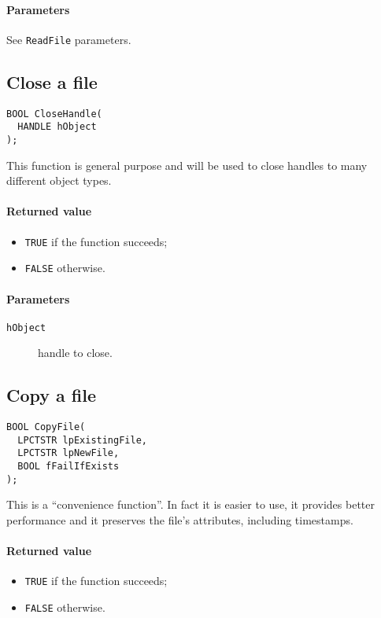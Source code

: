 \paragraph{Parameters}
See \texttt{ReadFile} parameters.

\subsection{Close a file}
\begin{verbatim}
BOOL CloseHandle(
  HANDLE hObject
);
\end{verbatim}

This function is general purpose and will be used to close handles to many different object types.

\paragraph{Returned value}
\begin{itemize}
\item \texttt{TRUE} if the function succeeds;
\item \texttt{FALSE} otherwise.
\end{itemize}

\paragraph{Parameters}
\begin{description}
\item [\texttt{hObject}] handle to close.
\end{description}

\subsection*{Copy a file}
\begin{verbatim}
BOOL CopyFile(
  LPCTSTR lpExistingFile,
  LPCTSTR lpNewFile,
  BOOL fFailIfExists
);
\end{verbatim}

This is a ``convenience function''. In fact it is easier to use, it provides better performance and it preserves the file's attributes, including timestamps.

\paragraph{Returned value}
\begin{itemize}
\item \texttt{TRUE} if the function succeeds;
\item \texttt{FALSE} otherwise.
\end{itemize}

